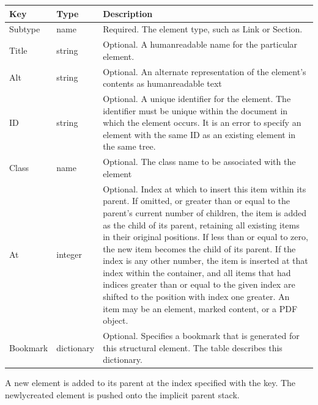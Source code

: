 \documentclass[letterpaper,12pt,english,openany,oneside]{sphinxmanual}
\begin{document}
\begin{savenotes}\sphinxattablestart
\centering
\begin{tabulary}{\linewidth}[t]{|T|T|T|}
\hline
\sphinxstyletheadfamily 
Key
&\sphinxstyletheadfamily 
Type
&\sphinxstyletheadfamily 
Description
\\
\hline
Subtype
&
name
&
Required. The element type, such as Link or Section.
\\
\hline
Title
&
string
&
Optional. A human\sphinxhyphen{}readable name for the particular element.
\\
\hline
Alt
&
string
&
Optional. An alternate representation of the element’s contents as human\sphinxhyphen{}readable text
\\
\hline
ID
&
string
&
Optional. A unique identifier for the element. The identifier must be unique within the document in which the element occurs. It is an error to specify an element with the same ID as an existing element in the same tree.
\\
\hline
Class
&
name
&
Optional. The class name to be associated with the element
\\
\hline
At
&
integer
&
Optional. Index at which to insert this item within its parent. If omitted, or greater than or equal to the parent’s current number of children, the item is added as the  child of its parent, retaining all existing items in their original positions. If less than or equal to zero, the new item becomes the  child of its parent. If the index is any other number, the item is inserted at that index within the container, and all items that had indices greater than or equal to the given index are shifted to the position with index one greater. An item may be an element, marked content, or a PDF object.
\\
\hline
Bookmark
&
dictionary
&
Optional. Specifies a bookmark that is generated for this structural element. The table  describes this dictionary.
\\
\hline
\end{tabulary}
\par
\sphinxattableend\end{savenotes}

A new element is added to its parent at the index specified with the  key. The newly\sphinxhyphen{}created element is pushed onto the implicit parent stack.
\end{document}
